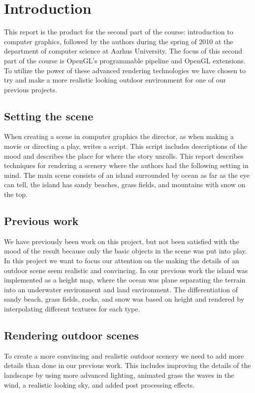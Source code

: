 
\chapter{Introduction}
This report is the product for the second part of the course:
introduction to computer graphics, followed by the authors during the
spring of 2010 at the department of computer science at Aarhus
University. The focus of this second part of the course is OpenGL's
programmable pipeline and OpenGL extensions.
%
To utilize the power of these advanced rendering technologies we have
chosen to try and make a more realistic looking outdoor environment
for one of our previous projects.

\section{Setting the scene}
When creating a scene in computer graphics the director, as when
making a movie or directing a play, writes a script. This script
includes descriptions of the mood and describes the place for where
the story unrolls.
%
This report describes techniques for rendering a scenery 
where the authors had the following setting in mind.
%
The main scene consists of an island surrounded by ocean as far as the
eye can tell, the island has sandy beaches, grass fields, and mountains
with snow on the top.

\section{Previous work}
We have previously been work on this project, but not been satisfied
with the mood of the result because only the basic objects in the
scene was put into play. In this project we want to focus our
attention on the making the details of an outdoor scene seem realistic
and convincing. In our previous work the island was implemented as a
height map, where the ocean was plane separating the terrain into an
underwater environment and land environment. The differentiation of
sandy beach, grass fields, rocks, and snow was based on height and
rendered by interpolating different textures for each type.

\section{Rendering outdoor scenes}
To create a more convincing and realistic outdoor scenery we need to
add more details than done in our previous work. This includes
improving the details of the landscape by using more advanced
lighting, animated grass the waves in the wind, a realistic looking
sky, and added post processing effects.

